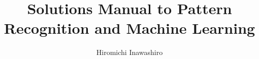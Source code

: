\documentclass[12pt]{article}
\title{Solutions Manual to Pattern Recognition and Machine Learning}
\author{Hiromichi Inawashiro}
\date{}
\begin{document}
\maketitle{}
\end{document}
